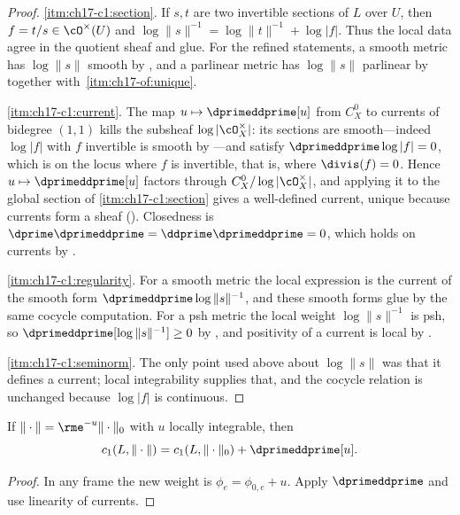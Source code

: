 \begin{proof}
\cref{itm:ch17-c1:section}.  If $s,t$ are two invertible sections of $L$
over $U$, then $f=t/s\in\cO^\times(U)$ and
$\log\|s\|^{-1}=\log\|t\|^{-1}+\log|f|$.  Thus the local data agree in the
quotient sheaf and glue.  For the refined statements, a smooth metric has
$\log\|s\|$ smooth by , and a parlinear metric
has $\log\|s\|$ parlinear by  together
with \,\cref{itm:ch17-of:unique}.

\cref{itm:ch17-c1:current}.  The map $u\mapsto\dprimeddprime[u]$ from
$C^0_X$ to currents of bidegree $(1,1)$ kills the subsheaf
$\log|\cO_X^\times|$: its sections are smooth---indeed
$\log|f|$ with $f$ invertible is smooth by
---and satisfy
$\dprimeddprime\log|f|=0$, which is
 on the locus where $f$ is invertible, that
is, where $\divis(f)=0$.  Hence $u\mapsto\dprimeddprime[u]$ factors
through $C^0_X/\log|\cO_X^\times|$, and applying it to the global section
of \cref{itm:ch17-c1:section} gives a well-defined current, unique because
currents form a sheaf ().  Closedness is
$\dprime\dprimeddprime=\ddprime\dprimeddprime=0$, which holds on
currents by .

\cref{itm:ch17-c1:regularity}.  For a smooth metric the local expression is
the current of the smooth form $\dprimeddprime\log\|s\|^{-1}$, and these
smooth forms glue by the same cocycle computation.  For a psh metric the
local weight $\log\|s\|^{-1}$ is psh, so
$\dprimeddprime[\log\|s\|^{-1}]\ge0$ by
, and positivity of a current is local
by .

\cref{itm:ch17-c1:seminorm}.  The only point used above about $\log\|s\|$
was that it defines a current; local integrability supplies that, and the
cocycle relation is unchanged because $\log|f|$ is continuous.
\end{proof}

\begin{proposition}
\label{prop:cld-c1-metric-change}
If $\|\cdot\|=\rme^{-u}\|\cdot\|_0$ with $u$ locally integrable, then
\[
       c_1(L,\|\cdot\|)=c_1(L,\|\cdot\|_0)+\dprimeddprime[u].
\]
\end{proposition}
\begin{proof}
In any frame the new weight is $\phi_e=\phi_{0,e}+u$.  Apply
$\dprimeddprime$ and use linearity of currents.
\end{proof}

